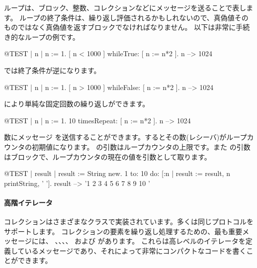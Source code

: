 \documentclass[a4paper,10pt,twoside]{book}
\begin{document}
ループは、ブロック、整数、コレクションなどにメッセージを送ることで表します。
ループの終了条件は、繰り返し評価されるかもしれないので、真偽値そのものではなく真偽値を返すブロックでなければなりません。
以下は非常に手続き的なループの例です。


\begin{code}{@TEST | n |}
n := 1.
[ n < 1000 ] whileTrue: [ n := n*2 ].
n --> 1024
\end{code}

\noindent
{} では終了条件が逆になります。
\begin{code}{@TEST | n |}
n := 1.
[ n > 1000 ] whileFalse: [ n := n*2 ].
n --> 1024
\end{code}

\noindent
{} により単純な固定回数の繰り返しができます。

\begin{code}{@TEST | n |}
n := 1.
10 timesRepeat: [ n := n*2 ].
n --> 1024
\end{code}

数にメッセージ  を送信することができます。するとその数(レシーバ)がループカウンタの初期値になります。
 の引数はループカウンタの上限です。また  の引数はブロックで、ループカウンタの現在の値を引数として取ります。

\begin{code}{@TEST | result |}
result := String new.
1 to: 10 do: [:n | result := result, n printString, ' '].
result --> '1 2 3 4 5 6 7 8 9 10 '
\end{code}


\paragraph{高階イテレータ}
コレクションはさまざまなクラスで実装されています。多くは同じプロトコルをサポートします。
コレクションの要素を繰り返し処理するための、最も重要メッセージには、
、、、、 および  があります。
これらは高レベルのイテレータを定義しているメッセージであり、それによって非常にコンパクトなコードを書くことができます。
\end{document}

